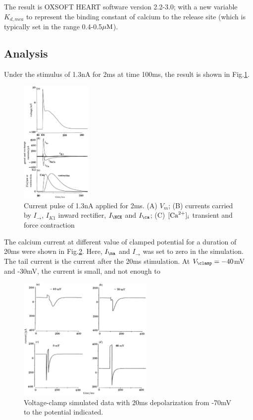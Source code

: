 The result is OXSOFT HEART software version 2.2-3.0; with a new variable
$K_{d,mca}$ to represent the binding constant of calcium to the release site (which is
typically set in the range 0.4-0.5${\mu\text{M}}$).

\subsection{Analysis}

Under the stimulus of 1.3nA for 2ms at time 100ms, the result is shown in
Fig.\ref{fig:Earm1990_current}.

\begin{figure}[hbt]
  \centerline{\includegraphics[height=6cm]{./images/Earm1990_current.eps}}
  \caption{Current pulse of 1.3nA applied for 2ms. (A) $V_m$; (B) currents
  carried by $I_\to$, $I_{K1}$ inward rectifier, $I_\NCX$ and $I_\ca$; (C)
  $[{\text{Ca}^{2+}}]_i$ transient and force contraction}
  \label{fig:Earm1990_current}
\end{figure}

The calcium current at different value of clamped potential for a duration of
20ms were shown in Fig.\ref{fig:Earm1990_current2}. Here, $I_\na$ and $I_\to$
was set to zero in the simulation. The tail current is the current after the
20ms stimulation. At $V_\clamp=-40$mV and -30mV, the current is small, and
not enough to

\begin{figure}[hbt]
  \centerline{\includegraphics[height=6cm]{./images/Earm1990_Ica.eps}}
  \caption{Voltage-clamp simulated data with 20ms depolarization from -70mV to
  the potential indicated.}
  \label{fig:Earm1990_current2}
\end{figure}

